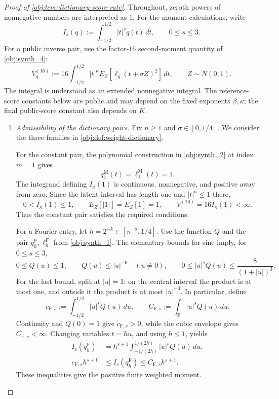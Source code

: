 \begin{proof}[Proof of \cref{obj:lem:dictionary-score-rate}]
Throughout, zeroth powers of nonnegative numbers are interpreted as \(1\). For the moment calculations, write
\[
I_s(q):=\int_{-1/2}^{1/2}|t|^s q(t)\,dt,
\qquad 0\le s\le3.
\]
For a public inverse pair, use the factor-\(16\) second-moment quantity of \cref{obj:synth_4}:
\[
V_q^{(16)}:=16\int_{-1/2}^{1/2}|t|^\kappa
E_Z[\ell_q(t+\sigma Z)^2]\,dt,
\qquad Z\sim N(0,1).
\]
The integral is understood as an extended nonnegative integral. The reference-score constants below are public and may depend on the fixed exponents \(\beta,\kappa\); the final public-score constant also depends on \(K\).

\begin{enumerate}
\item \emph{Admissibility of the dictionary pairs.}
Fix \(n\ge1\) and \(\sigma\in[0,1/4]\). We consider the three families in \cref{obj:def:weight-dictionary}.

For the constant pair, the polynomial construction in \cref{obj:synth_2} at index \(m=1\) gives
\[
q_1^{\mathrm M}(t)=\ell_1^{\mathrm M}(t)=1.
\]
The integrand defining \(I_\kappa(1)\) is continuous, nonnegative, and positive away from zero. Since the latent interval has length one and \(|t|^\kappa\le1\) there,
\[
0<I_\kappa(1)\le1,
\qquad
E_Z[|1|]=E_Z[1]=1,
\qquad
V_1^{(16)}=16I_\kappa(1)<\infty.
\]
Thus the constant pair satisfies the required conditions.

For a Fourier entry, let \(h=2^{-k}\in[n^{-2},1/4]\). Use the function \(Q\) and the pair \(q_h^{\mathrm F},\ell_h^{\mathrm F}\) from \cref{obj:synth_1}. The elementary bounds for sine imply, for \(0\le s\le3\),
\[
0\le Q(u)\le1,
\qquad
Q(u)\le |u|^{-6}\quad(u\ne0),
\qquad
0\le |u|^sQ(u)\le\frac{8}{(1+|u|)^3}.
\]
For the last bound, split at \(|u|=1\): on the central interval the product is at most one, and outside it the product is at most \(|u|^{-3}\). In particular, define
\[
c_{\mathrm F,s}:=\int_{-1/2}^{1/2}|u|^sQ(u)\,du,
\qquad
C_{\mathrm F,s}:=\int_{\mathbb R}|u|^sQ(u)\,du.
\]
Continuity and \(Q(0)=1\) give \(c_{\mathrm F,s}>0\), while the cubic envelope gives \(C_{\mathrm F,s}<\infty\). Changing variables \(t=hu\), and using \(h\le1\), yields
\[
\begin{aligned}
I_s(q_h^{\mathrm F})
&=h^{s+1}
  \int_{-1/(2h)}^{1/(2h)}|u|^sQ(u)\,du,\\
c_{\mathrm F,s}h^{s+1}
&\le I_s(q_h^{\mathrm F})
 \le C_{\mathrm F,s}h^{s+1}.
\end{aligned}
\]
These inequalities give the positive finite weighted moment.


\end{enumerate}
\end{proof}
